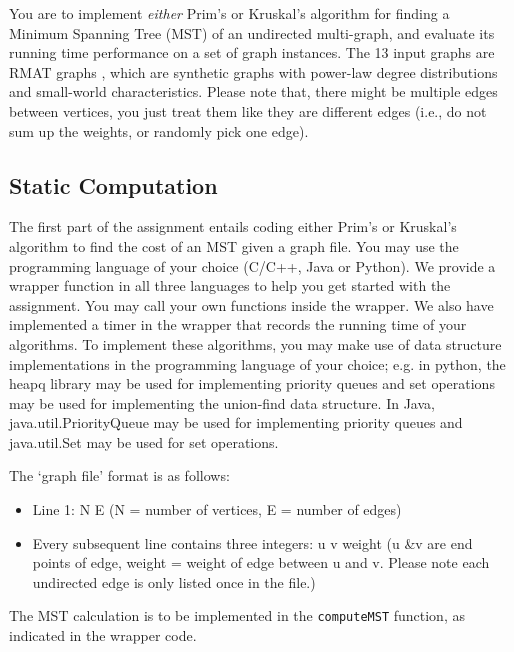 \documentclass{article}
\begin{document}
You are to implement {\it either} Prim's or Kruskal's algorithm for finding a
Minimum Spanning Tree (MST) of an undirected multi-graph, and evaluate
its running
time performance on a set of graph instances. The 13 input graphs are RMAT
graphs \cite{rmat}, which are synthetic graphs with power-law degree
distributions and small-world characteristics. Please note that, there might be
multiple edges between vertices, you just treat them like they are different
edges (i.e., do not sum up the weights, or randomly pick one edge).

\subsection{Static Computation}\label{subsec:static}
The first part of the assignment entails coding either Prim's or Kruskal's
algorithm to find the cost of an MST given a graph file. You may use the
programming language of your choice (C/C++, Java or Python). We provide
a wrapper function in all three languages to help you get started with the
assignment. You may call your own functions inside the wrapper. We also have
implemented a timer in the wrapper that records the running time of your
algorithms. To implement these algorithms, you may make use of data structure
implementations in the programming language of your choice; e.g. in python, the
heapq library may be used for implementing priority queues and set operations
may be used for implementing the union-find data structure. In Java,
java.util.PriorityQueue may be used for implementing priority queues and
java.util.Set may be used for set operations.

The `graph file' format is as follows:
\begin{itemize}
\item[] Line 1: N E (N = number of vertices, E = number of edges)
\item[] Every subsequent line contains three integers: u v weight (u \&v are
end points of edge, weight = weight of edge between u and v. Please note each
undirected edge is only listed once in the file.)
\end{itemize}
The MST calculation is to be implemented in the \texttt{computeMST} function,
as indicated in the wrapper code.
\end{document}
